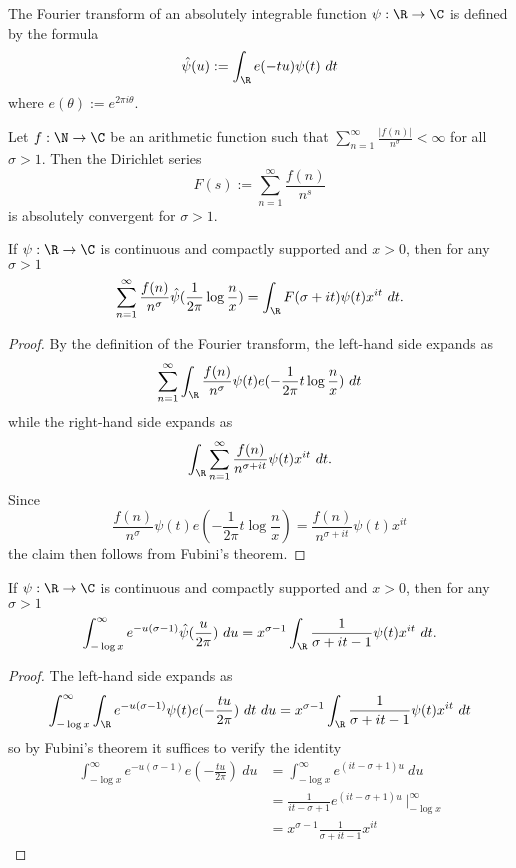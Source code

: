 
The Fourier transform of an absolutely integrable function $\psi: \R \to \C$ is defined by the formula
$$ \hat \psi(u) := \int_\R e(-tu) \psi(t)\ dt$$
where $e(\theta) := e^{2\pi i \theta}$.

Let $f: \N \to \C$ be an arithmetic function such that $\sum_{n=1}^\infty \frac{|f(n)|}{n^\sigma} < \infty$ for all $\sigma>1$.  Then the Dirichlet series
$$ F(s) := \sum_{n=1}^\infty \frac{f(n)}{n^s}$$
is absolutely convergent for $\sigma>1$.


\begin{lemma}\label{first-fourier}\leanok  If $\psi: \R \to \C$ is continuous and compactly supported and $x > 0$, then for any $\sigma>1$
  $$ \sum_{n=1}^\infty \frac{f(n)}{n^\sigma} \hat \psi( \frac{1}{2\pi} \log \frac{n}{x} ) = \int_\R F(\sigma + it) \psi(t) x^{it}\ dt.$$
\end{lemma}


\begin{proof}\leanok  By the definition of the Fourier transform, the left-hand side expands as
$$ \sum_{n=1}^\infty \int_\R \frac{f(n)}{n^\sigma} \psi(t) e( - \frac{1}{2\pi} t \log \frac{n}{x})\ dt$$
while the right-hand side expands as
$$ \int_\R \sum_{n=1}^\infty \frac{f(n)}{n^{\sigma+it}} \psi(t) x^{it}\ dt.$$
Since
$$\frac{f(n)}{n^\sigma} \psi(t) e( - \frac{1}{2\pi} t \log \frac{n}{x}) = \frac{f(n)}{n^{\sigma+it}} \psi(t) x^{it}$$
the claim then follows from Fubini's theorem.
\end{proof}


\begin{lemma}\label{second-fourier}\leanok If $\psi: \R \to \C$ is continuous and compactly supported and $x > 0$, then for any $\sigma>1$
$$ \int_{-\log x}^\infty e^{-u(\sigma-1)} \hat \psi(\frac{u}{2\pi})\ du = x^{\sigma - 1} \int_\R \frac{1}{\sigma+it-1} \psi(t) x^{it}\ dt.$$
\end{lemma}


\begin{proof}\leanok
The left-hand side expands as
$$ \int_{-\log x}^\infty \int_\R e^{-u(\sigma-1)} \psi(t) e(-\frac{tu}{2\pi})\ dt\ du =
x^{\sigma - 1} \int_\R \frac{1}{\sigma+it-1} \psi(t) x^{it}\ dt$$
so by Fubini's theorem it suffices to verify the identity
\begin{align*}
\int_{-\log x}^\infty e^{-u(\sigma-1)} e(-\frac{tu}{2\pi})\ du
&= \int_{-\log x}^\infty e^{(it - \sigma + 1)u}\ du \\
&= \frac{1}{it - \sigma + 1} e^{(it - \sigma + 1)u}\ \Big|_{-\log x}^\infty \\
&= x^{\sigma - 1} \frac{1}{\sigma+it-1} x^{it}
\end{align*}
\end{proof}


